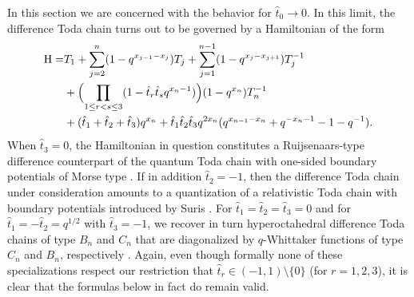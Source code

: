 \documentclass[reqno]{amsart}
\theoremstyle{remark}
\numberwithin{equation}{section}
\begin{document}
In this section we are concerned with the behavior for $\hat{t}_0\to 0$.  In this limit, the difference Toda chain  turns out to be governed by a Hamiltonian of the form
\begin{align}\label{H0}
\text{H} =&  T_1+ \sum_{j=2}^{n}  (1-q^{x_{j-1}-x_{j}})T_j +\sum_{j=1}^{n-1} (1-q^{x_j-x_{j+1}})T_j^{-1}\\
&  +\Bigl(\prod_{1\leq r<s\leq 3} (1-\hat{t}_r\hat{t}_sq^{x_n-1})\Bigr)  (1-q^{x_n})T_{n}^{-1} \nonumber \\
&+(\hat{t}_1+\hat{t}_2+\hat{t}_3)q^{x_n}+\hat{t}_1\hat{t}_2\hat{t}_3
q^{2x_n}(q^{x_{n-1}-x_n}+q^{-x_n-1}-1-q^{-1})  .\nonumber
\end{align}
When $\hat{t}_3=0$, the Hamiltonian in question constitutes a Ruijsenaars-type difference counterpart
of the quantum Toda chain
with one-sided boundary potentials of Morse type \cite{skl:boundary,ino:finite}. If in addition $\hat{t}_2=-1$,
then the difference Toda chain under consideration amounts to a quantization of a relativistic Toda chain with boundary potentials 
 introduced by Suris \cite{sur:discrete,kuz-tsy:quantum}.
For $\hat{t}_1=\hat{t}_2=\hat{t}_3=0$ and for $\hat{t}_1=-\hat{t}_2=q^{1/2}$ with $\hat{t}_3=-1$, we recover in turn hyperoctahedral difference Toda chains of type $B_n$ and $C_n$ that are diagonalized by
 $q$-Whittaker functions of  type $C_n$ and $B_n$, respectively \cite{eti:whittaker,sev:quantum,che:whittaker}.
Again, even though formally none of these specializations respect our restriction that
$\hat{t}_r\in (-1,1)\setminus \{ 0\}$ (for $r=1,2,3$), it is clear that the formulas below in fact do remain valid.
\end{document}
